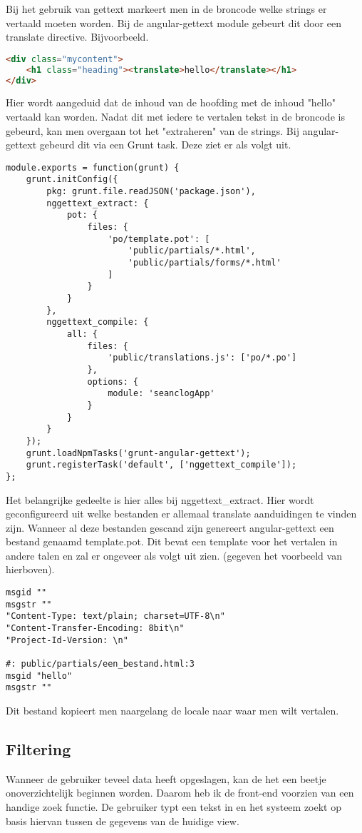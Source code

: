 \documentclass[a4paper,11pt]{article}
\begin{document}
Bij het gebruik van gettext markeert men in de broncode welke strings er vertaald moeten worden. Bij de angular-gettext module gebeurt dit door een translate directive. Bijvoorbeeld.
\begin{lstlisting}[language=html]
<div class="mycontent">
	<h1 class="heading"><translate>hello</translate></h1>
</div>
\end{lstlisting}
Hier wordt aangeduid dat de inhoud van de hoofding met de inhoud "hello" vertaald kan worden. Nadat dit met iedere te vertalen tekst in de broncode is gebeurd, kan men overgaan tot het "extraheren" van de strings. Bij angular-gettext gebeurd dit via een Grunt task. Deze ziet er als volgt uit.
\begin{lstlisting}
module.exports = function(grunt) {
	grunt.initConfig({
		pkg: grunt.file.readJSON('package.json'),
		nggettext_extract: {
			pot: {
				files: {
					'po/template.pot': [
						'public/partials/*.html',
						'public/partials/forms/*.html'
					]
				}
			}
		},
		nggettext_compile: {
			all: {
				files: {
					'public/translations.js': ['po/*.po']
				},
				options: {
					module: 'seanclogApp'
				}
			}
		}
	});
	grunt.loadNpmTasks('grunt-angular-gettext');
	grunt.registerTask('default', ['nggettext_compile']);
};
\end{lstlisting}
Het belangrijke gedeelte is hier alles bij nggettext\_extract. Hier wordt geconfigureerd uit welke bestanden er allemaal translate aanduidingen te vinden zijn. Wanneer al deze bestanden gescand zijn genereert angular-gettext een bestand genaamd template.pot. Dit bevat een template voor het vertalen in andere talen en zal er ongeveer als volgt uit zien. (gegeven het voorbeeld van hierboven).
\begin{lstlisting}
msgid ""
msgstr ""
"Content-Type: text/plain; charset=UTF-8\n"
"Content-Transfer-Encoding: 8bit\n"
"Project-Id-Version: \n"

#: public/partials/een_bestand.html:3
msgid "hello"
msgstr ""
\end{lstlisting}
Dit bestand kopieert men naargelang de locale naar waar men wilt vertalen.

\subsection{Filtering}
Wanneer de gebruiker teveel data heeft opgeslagen, kan de het een beetje onoverzichtelijk beginnen worden. Daarom heb ik de front-end voorzien van een handige zoek functie. De gebruiker typt een tekst in en het systeem zoekt op basis hiervan tussen de gegevens van de huidige view.
\end{document}
